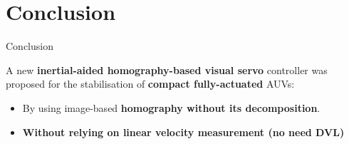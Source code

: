 \documentclass{beamer}
\begin{document}
\section{Conclusion}

\begin{frame}{Conclusion}

  A new \textbf{inertial-aided homography-based visual servo} controller was proposed for the stabilisation of \textbf{compact fully-actuated} AUVs:
  \begin{itemize}
  \footnotesize
  \item
    By using image-based \textbf{homography without its decomposition}.
  \item
    \textbf{Without relying on linear velocity measurement ({\color{red}no need DVL})}
  \end{itemize}
\vspace{0.5cm}


\end{frame}
\end{document}
